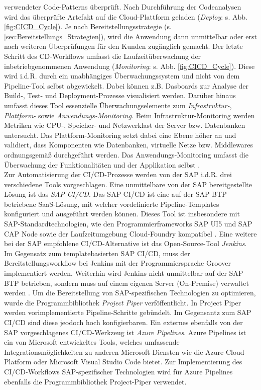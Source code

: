 verwendeter Code-Patterns überprüft. Nach Durchführung der Codeanalysen wird das überprüfte Artefakt auf die Cloud-Plattform geladen (\textit{Deploy}: s. Abb. \ref*{fig:CICD_Cycle}). Je nach Bereitstellungsstrategie (s. \ref*{sec:Bereitstellungs_Strategien}), wird die Anwendung dann unmittelbar oder erst nach weiteren Überprüfungen für den Kunden zugänglich gemacht. Der letzte Schritt des CD-Workflows umfasst die Laufzeitüberwachung der inbetriebgenommenen Anwendung (\textit{Monitoring}: s. Abb. \ref*{fig:CICD_Cycle}). Diese wird i.d.R. durch ein unabhängiges Überwachungssystem und nicht von dem Pipeline-Tool selbst abgewickelt. Dabei können z.B. Dasboards zur Analyse der Build-, Test- und Deployment-Prozesse visualisiert werden. Darüber hinaus umfasst dieses Tool essenzielle Überwachungselemente zum \textit{Infrastruktur-}, \textit{Plattform-} sowie \textit{Anwendungs-Monitoring}. Beim Infrastruktur-Monitoring werden Metriken wie CPU-, Speicher- und Netzwerklast der Server bzw. Datenbanken untersucht. Das Plattform-Monitoring setzt dabei eine Ebene höher an und validiert, dass Komponenten wie Datenbanken, virtuelle Netze bzw. Middlewares ordnungsgemäß durchgeführt werden. Das Anwendungs-Monitoring umfasst die Überwachung der Funktionalitäten und der Applikation selbst \cite[21]{Halstenberg.2020}.\\ 
Zur Automatisierung der CI/CD-Prozesse werden von der SAP i.d.R. drei verschiedene Tools vorgeschlagen. Eine unmittelbare von der SAP bereitgestellte Lösung ist das \textit{\ac{SAP CI/CD}}. Das SAP CI/CD ist eine auf der SAP BTP betriebene SaaS-Lösung, mit welcher vordefinierte Pipeline-Templates konfiguriert und ausgeführt werden können. Dieses Tool ist insbesondere mit SAP-Standardtechnologien, wie den Programmierframeworks SAP UI5 und SAP CAP Node sowie der Laufzeitumgebung Cloud-Foundry kompatibel \cite{.20230405}. Eine weitere bei der SAP empfohlene CI/CD-Alternative ist das Open-Source-Tool \textit{Jenkins}. Im Gegensatz zum templatebasierten SAP CI/CD, muss der Bereitstellungsworkflow bei Jenkins mit der Programmiersprache Groover implementiert werden. Weiterhin wird Jenkins nicht unmittelbar auf der SAP BTP betrieben, sondern muss auf einem eigenen Server (On-Premise) verwaltet werden \cite[Kap. 2]{Labouardy.2021}. Um die Bereitstellung von SAP-spezifischen Technologien zu optimieren, wurde die Programmbibliothek \textit{Project Piper} verföffentlicht. In Project Piper werden vorimplementierte Pipeline-Schritte gebündelt. Im Gegensantz zum SAP CI/CD sind diese jeodoch hoch konfigierbaren.
Ein externes ebenfalls von der SAP vorgeschlagenes CI/CD-Werkzeug ist \textit{Azure Pipelines}. Azure Pipelines ist ein von Microsoft entwickeltes Tools, welches umfassende Integrationsmöglichkeiten zu anderen Microsoft-Diensten wie die Azure-Cloud-Platform oder Microsoft Visual Studio Code bietet. Zur Implementierung des CI/CD-Workflows SAP-spezifischer Technologien wird für Azure Pipelines ebenfalls die Programmbibliothek Project-Piper verwendet.
